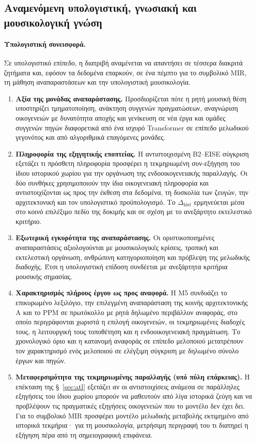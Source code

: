 \documentclass[11pt,a4paper]{article}
\begin{document}
\subsection{Αναμενόμενη υπολογιστική, γνωσιακή και μουσικολογική γνώση}

\paragraph{Υπολογιστική συνεισφορά.}
Σε υπολογιστικό επίπεδο, η διατριβή αναμένεται να απαντήσει σε τέσσερα διακριτά ζητήματα και, εφόσον τα δεδομένα επαρκούν, σε ένα πέμπτο για το συμβολικό MIR, τη μάθηση αναπαραστάσεων και την υπολογιστική μουσικολογία.
\begin{enumerate}[label=\textbf{\arabic*.},leftmargin=2.2em]
\item \textbf{Αξία της μονάδας αναπαράστασης.} Προσδιορίζεται πότε η ρητή μουσική θέση υποστηρίζει τμηματοποίηση, ανάκτηση συγγενών πραγματώσεων, αναγνώριση οικογενειών με δυνατότητα αποχής και γενίκευση σε νέα έργα και ομάδες συγγενών πηγών διαφορετικά από ένα ισχυρό Transformer σε επίπεδο μελωδικού γεγονότος και από αλγοριθμικά επαγόμενες μονάδες.
\item \textbf{Πληροφορία της εξηγητικής εποπτείας.} Η αντιστοιχισμένη B2--EISE σύγκριση εξετάζει τι πρόσθετη πληροφορία προσφέρει η τεκμηριωμένη συν-εξήγηση του ίδιου ιστορικού χωρίου για την οργάνωση της ενδοοικογενειακής παραλλαγής. Οι δύο συνθήκες χρησιμοποιούν την ίδια οικογενειακή πληροφορία και αντιστοιχίζονται ως προς την έκθεση στα δεδομένα, τη δυσκολία των ζευγών, την αρχιτεκτονική και τον υπολογιστικό προϋπολογισμό. Το $\Delta_{\mathrm{hist}}$ ερμηνεύεται μέσα στο κοινό επιλέξιμο πεδίο της δοκιμής και σε σχέση με το ανεξάρτητο εκτελεστικό κριτήριο.
\item \textbf{Εξωτερική εγκυρότητα της αναπαράστασης.} Οι οριστικοποιημένες αναπαραστάσεις αξιολογούνται με μουσικολογικές κρίσεις, τροπική και εκτελεστική οργάνωση, ανθρώπινη κατηγοριοποίηση και πρόβλεψη της μελωδικής διαδοχής. Έτσι η υπολογιστική επίδοση συνδέεται με ανεξάρτητα κριτήρια μουσικής σημασίας.
\item \textbf{Χαρακτηρισμός πλήρους έργου ως προς αναφορά.} Η M5 συνδυάζει το επικυρωμένο λεξιλόγιο, την επιλεγμένη αναπαράσταση της κοινής αρχιτεκτονικής A και το PPM σε πρωτόκολλο με ρητά δηλωμένο περιβάλλον αναφοράς, στο οποίο περιγράφονται χωριστά η επιλογή οικογενειών, οι τεκμηριωμένες διαδοχές τους, η λειτουργική τους τοποθέτηση και η ενδοοικογενειακή πραγμάτωση. Το χρονολογικό όριο και η κατανομή αναφοράς σε επίπεδο μελοποιού μετατρέπουν τον χαρακτηρισμό ενός μελοποιού σε ελέγξιμη σύγκριση με δηλωμένο σύνολο έργων και πηγών.
\item \textbf{Μεταφερσιμότητα της τεκμηριωμένης παραλλαγής (υπό πύλη επάρκειας).} Η επέκταση της §~\ref{sec:atl} εξετάζει αν οι αντιστοιχίσεις ανάμεσα σε παράλληλες εξηγήσεις του ίδιου χωρίου μπορούν να μαθευτούν από λίγα ιστορικά ζεύγη και να προβλέψουν τις πραγματικές εξηγήσεις οικογενειών που το μοντέλο δεν έχει δει. Για το συμβολικό MIR προσφέρει μοντέλο μελωδικής μεταβολής εκτιμημένο από ιστορικά τεκμήρια· για τη μουσικολογία, μετρήσιμη περιγραφή του τι διατηρεί η εξήγηση πέρα από τη σημειογραφική επιφάνεια.
\end{enumerate}
\end{document}
